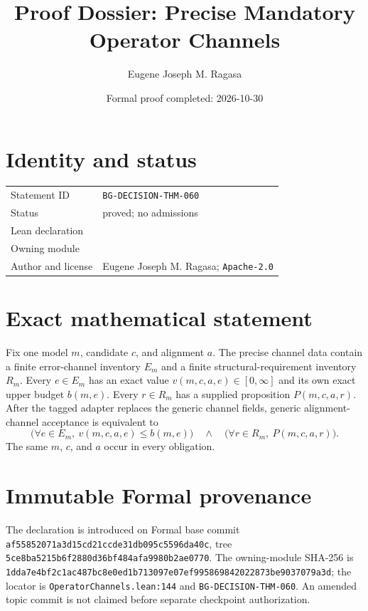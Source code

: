 \documentclass[11pt]{article}
\title{Proof Dossier: Precise Mandatory Operator Channels}
\author{Eugene Joseph M. Ragasa}
\date{Formal proof completed: 2026-10-30}
\begin{document}
\raggedright
\maketitle

\section{Identity and status}
\begin{tabularx}{\textwidth}{@{}lY@{}}
\toprule
Statement ID & \texttt{BG-DECISION-THM-060} \\
Status & proved; no admissions \\
Lean declaration &  \\
Owning module &  \\
Author and license & Eugene Joseph M. Ragasa; \texttt{Apache-2.0} \\
\bottomrule
\end{tabularx}

\section{Exact mathematical statement}
Fix one model $m$, candidate $c$, and alignment $a$.  The precise channel data contain a finite error-channel inventory $E_m$ and a finite structural-requirement inventory $R_m$.  Every $e\in E_m$ has an exact value $v(m,c,a,e)\in[0,\infty]$ and its own exact upper budget $b(m,e)$.  Every $r\in R_m$ has a supplied proposition $P(m,c,a,r)$.  After the tagged adapter replaces the generic channel fields, generic alignment-channel acceptance is equivalent to
\[
  \bigl(\forall e\in E_m,\ v(m,c,a,e)\le b(m,e)\bigr)
  \quad\land\quad
  \bigl(\forall r\in R_m,\ P(m,c,a,r)\bigr).
\]
The same $m$, $c$, and $a$ occur in every obligation.

\section{Immutable Formal provenance}
The declaration is introduced on Formal base commit
\texttt{af55852071a3d15cd21ccde31db095c5596da40c}, tree
\texttt{5ce8ba5215b6f2880d36bf484afa9980b2ae0770}.  The owning-module SHA-256 is
\texttt{1dda7e4bf2c1ac487bc8e0ed1b713097e07ef995869842022873be9037079a3d}; the locator is \texttt{OperatorChannels.lean:144} and \texttt{BG-DECISION-THM-060}.  An amended topic commit is not claimed before separate checkpoint authorization.
\end{document}
